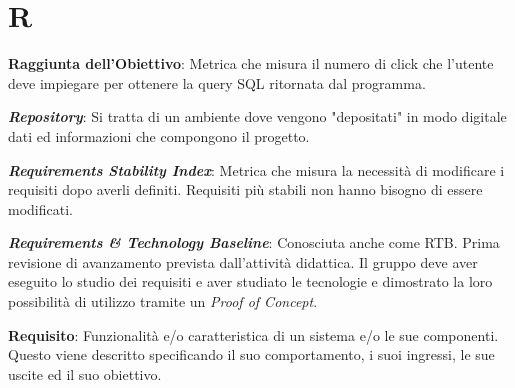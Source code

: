\documentclass[5pt]{article}
\begin{document}
\section*{R}
\begin{flushleft}
	
\textbf{Raggiunta dell'Obiettivo}: Metrica che misura il numero di click che l'utente deve impiegare per ottenere la query SQL ritornata dal programma.\newline

\textbf{\textit{Repository}}: Si tratta di un ambiente dove vengono "depositati" in modo digitale dati ed informazioni che compongono il progetto.\newline

\textbf{\textit{Requirements Stability Index}}: Metrica che misura la necessità di modificare i requisiti dopo averli definiti. Requisiti più stabili non hanno bisogno di essere modificati.\newline

\textbf{\textit{Requirements \& Technology Baseline}}: Conosciuta anche come RTB. Prima revisione di avanzamento prevista dall'attività didattica. Il gruppo deve aver eseguito lo studio dei requisiti e aver studiato le tecnologie e dimostrato la loro possibilità di utilizzo tramite un \textit{Proof of Concept}.\newline

\textbf{Requisito}: Funzionalità e/o caratteristica di un sistema e/o le sue componenti. Questo viene descritto specificando il suo comportamento, i suoi ingressi, le sue uscite ed il suo obiettivo.

\end{flushleft}

\pagebreak
\end{document}
